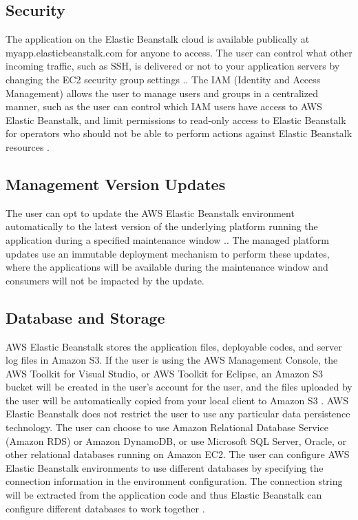\documentclass[9pt,twocolumn,twoside]{../../styles/osajnl}
\begin{document}
\subsection{Security}

The application on the Elastic Beanstalk cloud is available publically
at myapp.elasticbeanstalk.com for anyone to access. The user can
control what other incoming traffic, such as SSH, is delivered or not
to your application servers by changing the EC2 security group
settings \cite{elastic-faq}.. The IAM (Identity and Access Management)
allows the user to manage users and groups in a centralized manner,
such as the user can control which IAM users have access to AWS
Elastic Beanstalk, and limit permissions to read-only access to
Elastic Beanstalk for operators who should not be able to perform
actions against Elastic Beanstalk resources \cite{elastic-faq}.

\subsection{Management Version Updates}

The user can opt to update the AWS Elastic Beanstalk environment
automatically to the latest version of the underlying platform running
the application during a specified maintenance window
\cite{elastic-faq}..  The managed platform updates use an immutable
deployment mechanism to perform these updates, where the applications
will be available during the maintenance window and consumers will not
be impacted by the update.

\subsection{Database and Storage}

AWS Elastic Beanstalk stores the application files, deployable codes,
and server log files in Amazon S3. If the user is using the AWS
Management Console, the AWS Toolkit for Visual Studio, or AWS Toolkit
for Eclipse, an Amazon S3 bucket will be created in the user's account
for the user, and the files uploaded by the user will be automatically
copied from your local client to Amazon S3 \cite{elastic-faq}. AWS
Elastic Beanstalk does not restrict the user to use any particular
data persistence technology. The user can choose to use Amazon
Relational Database Service (Amazon RDS) or Amazon DynamoDB, or use
Microsoft SQL Server, Oracle, or other relational databases running on
Amazon EC2. The user can configure AWS Elastic Beanstalk environments
to use different databases by specifying the connection information in
the environment configuration. The connection string will be extracted
from the application code and thus Elastic Beanstalk can configure
different databases to work together \cite{elastic-faq}.
\end{document}
